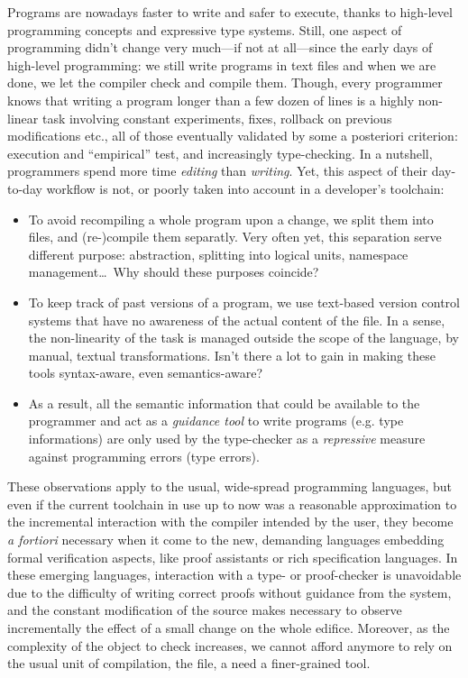\documentclass[preprint]{sigplanconf}
\begin{document}
Programs are nowadays faster to write and safer to execute, thanks to
high-level programming concepts and expressive type systems. Still,
one aspect of programming didn't change very much---if not at
all---since the early days of high-level programming: we still write
programs in text files and when we are done, we let the compiler check
and compile them.  Though, every programmer knows that writing a
program longer than a few dozen of lines is a highly non-linear task
involving constant experiments, fixes, rollback on previous
modifications etc., all of those eventually validated by some a
posteriori criterion: execution and ``empirical'' test, and
increasingly type-checking. In a nutshell, programmers spend more time
\emph{editing} than \emph{writing}. Yet, this aspect of their
day-to-day workflow is not, or poorly taken into account in a
developer's toolchain:
\begin{itemize}
\item To avoid recompiling a whole program upon a change, we split
  them into files, and (re-)compile them separatly. Very often yet,
  this separation serve different purpose: abstraction, splitting into
  logical units, namespace management\ldots\ Why should these purposes
  coincide?
\item To keep track of past versions of a program, we use text-based
  version control systems that have no awareness of the actual content
  of the file. In a sense, the non-linearity of the task is managed
  outside the scope of the language, by manual, textual
  transformations. Isn't there a lot to gain in making these tools
  syntax-aware, even semantics-aware?
\item As a result, all the semantic information that could be
  available to the programmer and act as a \emph{guidance tool} to
  write programs (e.g. type informations) are only used by the
  type-checker as a \emph{repressive} measure against programming
  errors (type errors).
\end{itemize}

These observations apply to the usual, wide-spread programming
languages, but even if the current toolchain in use up to now was a
reasonable approximation to the incremental interaction with the
compiler intended by the user, they become \emph{a fortiori} necessary
when it come to the new, demanding languages embedding formal
verification aspects, like proof assistants or rich specification
languages. In these emerging languages, interaction with a type- or
proof-checker is unavoidable due to the difficulty of writing correct
proofs without guidance from the system, and the constant modification
of the source makes necessary to observe incrementally the effect of a
small change on the whole edifice. Moreover, as the complexity of the
object to check increases, we cannot afford anymore to rely on the
usual unit of compilation, the file, a need a finer-grained tool.
\end{document}

